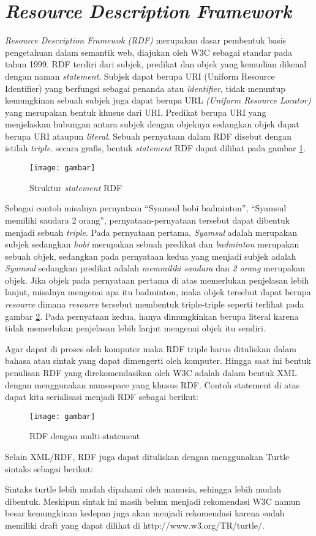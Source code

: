\section{\emph{Resource Description Framework}}
\emph{Resource Description Framewok (RDF)} merupakan dasar pembentuk basis pengetahuan dalam semantik web, diajukan oleh W3C sebagai standar pada tahun 1999. RDF terdiri dari subjek, predikat dan objek yang kemudian dikenal dengan naman \emph{statement}. Subjek dapat berupa URI (Uniform Resource Identifier) yang berfungsi sebagai penanda atau \emph{identifier}, tidak menuntup kemungkinan sebuah subjek juga dapat berupa URL \emph{(Uniform Resource Locator)} yang merupakan bentuk khusus dari URI.  Predikat berupa URI yang menjelaskan hubungan antara subjek dengan objeknya sedangkan objek dapat berupa URI ataupun \emph{literal}. Sebuah pernyataan dalam RDF disebut dengan istilah \emph{triple}. secara grafis, bentuk \emph{statement} RDF dapat dilihat pada gambar \ref{fig:rdf_statement}.

\begin{figure}[!]
	\centering
	\texttt{[image: gambar]}
	\caption{Struktur \emph{statement} RDF}
	\label{fig:rdf_statement}
\end{figure}

Sebagai contoh misalnya pernyataan ``Syamsul hobi badminton'', ``Syamsul memiliki saudara 2 orang'', pernyataan-pernyataan tersebut dapat dibentuk menjadi sebuah \emph{triple}. Pada pernyataan pertama, \emph{Syamsul} adalah merupakan subjek sedangkan \emph{hobi} merupakan sebuah predikat dan \emph{badminton} merupakan sebuah objek, sedangkan pada pernyataan kedua yang menjadi subjek adalah \emph{Syamsul} sedangkan predikat adalah \emph{memmiliki saudara} dan \emph{2 orang} merupakan objek. Jika objek pada pernyataan pertama di atas memerlukan penjelasan lebih lanjut, misalnya mengenai apa itu badminton, maka objek tersebut dapat berupa \emph{resource} dimana \emph{resource} tersebut membentuk triple-triple seperti terlihat pada gambar \ref{fig:rdf_multi_statement}. Pada pernyataan kedua, hanya dimungkinkan berupa literal karena tidak memerlukan penjelasan lebih lanjut mengenai objek itu sendiri.

Agar dapat di proses oleh komputer maka RDF triple harus dituliskan dalam bahasa atau sintak yang dapat dimengerti oleh komputer. Hingga saat ini bentuk penulisan RDF yang direkomendasikan oleh W3C adalah dalam bentuk XML dengan menggunakan namespace yang khusus RDF. Contoh statement di atas dapat kita serialisasi menjadi RDF sebagai berikut:

\begin{figure}[!]
	\centering
	\texttt{[image: gambar]}
	\caption{RDF dengan multi-statement}
	\label{fig:rdf_multi_statement}
\end{figure}
Selain XML/RDF, RDF juga dapat dituliskan dengan menggunakan Turtle sintaks sebagai berikut:


Sintaks turtle lebih mudah dipahami oleh manusia, sehingga lebih mudah dibentuk. Meskipun sintak ini masih belum menjadi rekomendasi W3C namun besar kemungkinan kedepan juga akan menjadi rekomendasi karena sudah memiliki draft yang dapat dilihat di http://www.w3.org/TR/turtle/.